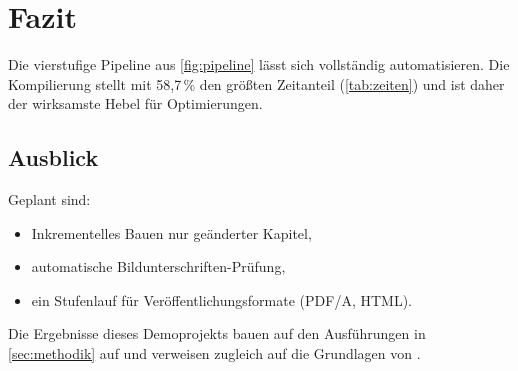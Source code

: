 \section{Fazit}
\label{sec:fazit}

Die vierstufige Pipeline aus \cref{fig:pipeline} lässt sich vollständig
automatisieren. Die Kompilierung stellt mit 58{,}7\,\% den größten
Zeitanteil (\cref{tab:zeiten}) und ist daher der wirksamste Hebel für
Optimierungen.

\subsection{Ausblick}
\label{sec:ausblick}
Geplant sind:
\begin{itemize}[leftmargin=*]
  \item Inkrementelles Bauen nur geänderter Kapitel,
  \item automatische Bildunterschriften-Prüfung,
  \item ein Stufenlauf für Veröffentlichungsformate (PDF/A, HTML).
\end{itemize}

Die Ergebnisse dieses Demoprojekts bauen auf den Ausführungen in
\cref{sec:methodik} auf und verweisen zugleich auf die Grundlagen von
\cite{lamport1994,mittelbach2004}.

